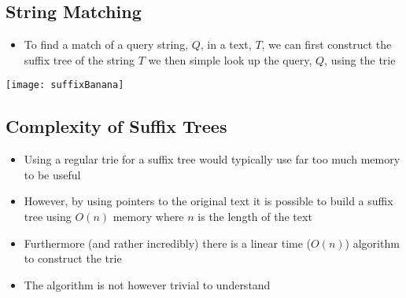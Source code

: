 
\begin{slide}
\section{String Matching}

\begin{PauseHighLight}
  \begin{itemize}
  \item To find a match of a query string, $Q$, in a text, $T$, we can
    first construct the suffix tree of the string $T$ we then simple look
    up the query, $Q$, using the trie
  \end{itemize}
    \begin{center}
      \texttt{[image: suffixBanana]}\pause
    \end{center}
\end{PauseHighLight}

\end{slide}


\begin{slide}
\section{Complexity of Suffix Trees}

\begin{PauseHighLight}
  \begin{itemize}
  \item Using a regular trie for a suffix tree would typically use far
    too much memory to be useful\pause
  \item However, by using pointers to the original text it is possible
    to build a suffix tree using $O(n)$ memory where $n$ is the length
    of the text\pause
  \item Furthermore (and rather incredibly) there is a linear time
    ($O(n)$) algorithm to construct the trie\pause
  \item The algorithm is not however trivial to understand\pause
  \end{itemize}
\end{PauseHighLight}

\end{slide}


